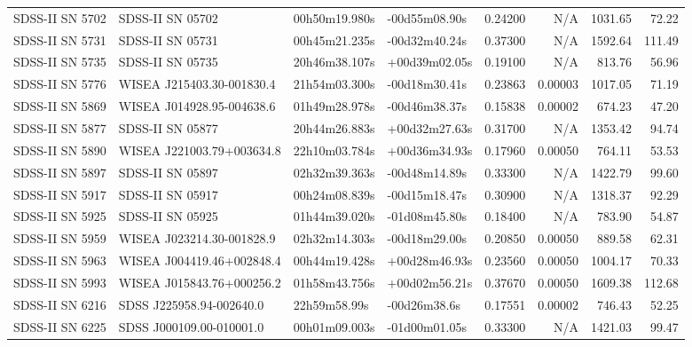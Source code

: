 \begin{longtable}{llllrrrr}
SDSS-II SN 5702  &                SDSS-II SN 05702 &   00h50m19.980s &   -00d55m08.90s &  0.24200 &      N/A &  1031.65 &       72.22 \\
SDSS-II SN 5731  &                SDSS-II SN 05731 &   00h45m21.235s &   -00d32m40.24s &  0.37300 &      N/A &  1592.64 &      111.49 \\
SDSS-II SN 5735  &                SDSS-II SN 05735 &   20h46m38.107s &   +00d39m02.05s &  0.19100 &      N/A &   813.76 &       56.96 \\
SDSS-II SN 5776  &       WISEA J215403.30-001830.4 &   21h54m03.300s &   -00d18m30.41s &  0.23863 &  0.00003 &  1017.05 &       71.19 \\
SDSS-II SN 5869  &       WISEA J014928.95-004638.6 &   01h49m28.978s &   -00d46m38.37s &  0.15838 &  0.00002 &   674.23 &       47.20 \\
SDSS-II SN 5877  &                SDSS-II SN 05877 &   20h44m26.883s &   +00d32m27.63s &  0.31700 &      N/A &  1353.42 &       94.74 \\
SDSS-II SN 5890  &       WISEA J221003.79+003634.8 &   22h10m03.784s &   +00d36m34.93s &  0.17960 &  0.00050 &   764.11 &       53.53 \\
SDSS-II SN 5897  &                SDSS-II SN 05897 &   02h32m39.363s &   -00d48m14.89s &  0.33300 &      N/A &  1422.79 &       99.60 \\
SDSS-II SN 5917  &                SDSS-II SN 05917 &   00h24m08.839s &   -00d15m18.47s &  0.30900 &      N/A &  1318.37 &       92.29 \\
SDSS-II SN 5925  &                SDSS-II SN 05925 &   01h44m39.020s &   -01d08m45.80s &  0.18400 &      N/A &   783.90 &       54.87 \\
SDSS-II SN 5959  &       WISEA J023214.30-001828.9 &   02h32m14.303s &   -00d18m29.00s &  0.20850 &  0.00050 &   889.58 &       62.31 \\
SDSS-II SN 5963  &       WISEA J004419.46+002848.4 &   00h44m19.428s &   +00d28m46.93s &  0.23560 &  0.00050 &  1004.17 &       70.33 \\
SDSS-II SN 5993  &       WISEA J015843.76+000256.2 &   01h58m43.756s &   +00d02m56.21s &  0.37670 &  0.00050 &  1609.38 &      112.68 \\
SDSS-II SN 6216  &        SDSS J225958.94-002640.0 &    22h59m58.99s &    -00d26m38.6s &  0.17551 &  0.00002 &   746.43 &       52.25 \\
SDSS-II SN 6225  &        SDSS J000109.00-010001.0 &   00h01m09.003s &   -01d00m01.05s &  0.33300 &      N/A &  1421.03 &       99.47 \\

\end{longtable}
